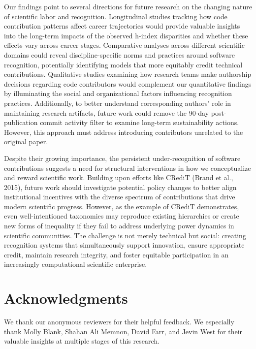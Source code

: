 \documentclass[
  number,
  3p,
  onecolumn]{elsarticle}
\begin{document}
Our findings point to several directions for future research on the
changing nature of scientific labor and recognition. Longitudinal
studies tracking how code contribution patterns affect career
trajectories would provide valuable insights into the long-term impacts
of the observed h-index disparities and whether these effects vary
across career stages. Comparative analyses across different scientific
domains could reveal discipline-specific norms and practices around
software recognition, potentially identifying models that more equitably
credit technical contributions. Qualitative studies examining how
research teams make authorship decisions regarding code contributors
would complement our quantitative findings by illuminating the social
and organizational factors influencing recognition practices.
Additionally, to better understand corresponding authors' role in
maintaining research artifacts, future work could remove the 90-day
post-publication commit activity filter to examine long-term
sustainability actions. However, this approach must address introducing
contributors unrelated to the original paper.

Despite their growing importance, the persistent under-recognition of
software contributions suggests a need for structural interventions in
how we conceptualize and reward scientific work. Building upon efforts
like CRediT (Brand et al., 2015), future work should investigate
potential policy changes to better align institutional incentives with
the diverse spectrum of contributions that drive modern scientific
progress. However, as the example of CRediT demonstrates, even
well-intentioned taxonomies may reproduce existing hierarchies or create
new forms of inequality if they fail to address underlying power
dynamics in scientific communities. The challenge is not merely
technical but social: creating recognition systems that simultaneously
support innovation, ensure appropriate credit, maintain research
integrity, and foster equitable participation in an increasingly
computational scientific enterprise.

\section*{Acknowledgments}\label{acknowledgments}

We thank our anonymous reviewers for their helpful feedback. We
especially thank Molly Blank, Shahan Ali Memnon, David Farr, and Jevin
West for their valuable insights at multiple stages of this research.
\end{document}
